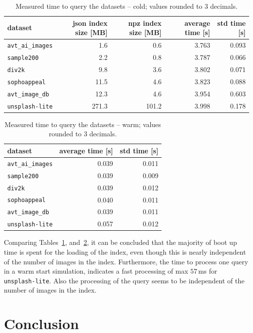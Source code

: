 \documentclass{article}
\begin{document}
\begin{table}[htb!]
\centering
\caption{Measured time to query the datasets -- cold; values rounded to 3 decimals.}
\label{tbl:measured_time_to_query_the_datasets_cold}
\begin{tabular}{lrrrr}
\toprule
dataset                  & json index size [MB] & npz index size [MB] & average time [s] & std time [s]  \\
\midrule
\texttt{avt\_ai\_images} & 1.6                  & 0.6                 & 3.763            & 0.093 \\
\texttt{sample200}       & 2.2                  & 0.8                 & 3.787            & 0.066 \\
\texttt{div2k}           & 9.8                  & 3.6                 & 3.802            & 0.071 \\
\texttt{sophoappeal}     & 11.5                 & 4.6                 & 3.823            & 0.088 \\
\texttt{avt\_image\_db}  & 12.3                 & 4.6                 & 3.954            & 0.603 \\
\texttt{unsplash-lite}   & 271.3                & 101.2               & 3.998            & 0.178 \\
\bottomrule
\end{tabular}
\end{table}

\begin{table}[htb!]
\centering
\caption{Measured time to query the datasets -- warm; values rounded to 3 decimals.}
\label{tbl:measured_time_to_query_the_datasets_warm}
\begin{tabular}{lrr}
\toprule
dataset                  & average time [s] & std time [s]  \\
\midrule
\texttt{avt\_ai\_images} & 0.039            & 0.011 \\
\texttt{sample200}       & 0.039            & 0.009 \\
\texttt{div2k}           & 0.039            & 0.012 \\
\texttt{sophoappeal}     & 0.040            & 0.011 \\
\texttt{avt\_image\_db}  & 0.039            & 0.011 \\
\texttt{unsplash-lite}   & 0.057            & 0.012 \\
\bottomrule
\end{tabular}
\end{table}


Comparing Tables~\ref{tbl:measured_time_to_query_the_datasets_cold}, and~\ref{tbl:measured_time_to_query_the_datasets_warm}, it can be concluded that the majority of boot up time is spent for the loading of the index, even though this is nearly independent of the number of images in the index.
Furthermore, the time to process one query in a warm start simulation, indicates a fast processing of max $57$\,ms for \texttt{unsplash-lite}.
Also the processing of the query seems to be independent of the number of images in the index.


\section{Conclusion}




\end{document}

